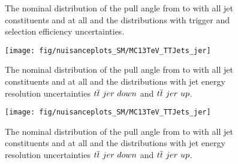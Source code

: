 \begin{description}
\begin{figure}[hbtp]
\centering
\def\twidth{0.45}
\hfil
{}
\caption{The nominal distribution of the pull angle from \leadingjet to \scndleadingjet with all jet constituents and at all \DeltaR and the distributions with trigger and selection efficiency uncertainties.}
\label{fig:trigselcorrection}
\end{figure}

\begin{figure}[hbtp]
\centering
\def\twidth{0.45}
\texttt{[image: fig/nuisanceplots\_SM/MC13TeV\_TTJets\_jer]}
\caption{The nominal distribution of the pull angle from \leadingjet to \scndleadingjet with all jet constituents and at all \DeltaR and the distributions with jet energy resolution uncertainties $\ttbar\ jer\ down$ and $\ttbar\ jer\ up$.}
\label{fig:MC13TeV_TTJets_jer}
\end{figure}


\begin{figure}[hbtp]
\centering
\def\twidth{0.45}
\texttt{[image: fig/nuisanceplots\_SM/MC13TeV\_TTJets\_jer]}
\caption{The nominal distribution of the pull angle from \leadingjet to \scndleadingjet with all jet constituents and at all \DeltaR and the distributions with jet energy resolution uncertainties $\ttbar\ jer\ down$ and $\ttbar\ jer\ up$.}
\label{fig:MC13TeV_TTJets_jer}
\end{figure}


\end{description}
